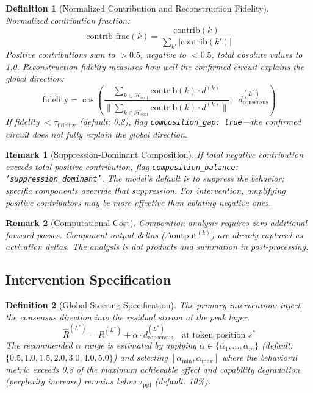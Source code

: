 \documentclass[11pt]{article}
\newtheorem{definition}{Definition}[section]
\newtheorem{remark}{Remark}[section]
\begin{document}
\begin{definition}[Normalized Contribution and Reconstruction Fidelity]
\label{def:contribution-normalization}
Normalized contribution fraction:
\begin{equation}
\text{contrib\_frac}(k) = \frac{\text{contrib}(k)}{\sum_{k'} |\text{contrib}(k')|}
\end{equation}
Positive contributions sum to $> 0.5$, negative to $< 0.5$, total absolute values to 1.0. Reconstruction fidelity measures how well the confirmed circuit explains the global direction:
\begin{equation}
\text{fidelity} = \cos\!\left(\frac{\sum_{k \in \mathcal{H}_{\text{conf}}} \text{contrib}(k) \cdot d^{(k)}}{\|\sum_{k \in \mathcal{H}_{\text{conf}}} \text{contrib}(k) \cdot d^{(k)}\|},\;\; d^{(L^*)}_{\text{consensus}}\right)
\end{equation}
If fidelity $< \tau_{\text{fidelity}}$ (default: 0.8), flag \texttt{composition\_gap: true}---the confirmed circuit does not fully explain the global direction.
\end{definition}

\begin{remark}[Suppression-Dominant Composition]
If total negative contribution exceeds total positive contribution, flag \texttt{composition\_balance: `suppression\_dominant'}. The model's default is to suppress the behavior; specific components override that suppression. For intervention, amplifying positive contributors may be more effective than ablating negative ones.
\end{remark}

\begin{remark}[Computational Cost]
Composition analysis requires zero additional forward passes. Component output deltas ($\Delta\text{output}^{(k)}$) are already captured as activation deltas. The analysis is dot products and summation in post-processing.
\end{remark}

\subsection{Intervention Specification}
\label{app:intervention-spec}

\begin{definition}[Global Steering Specification]
\label{def:global-steering}
The primary intervention: inject the consensus direction into the residual stream at the peak layer.
\begin{equation}
\hat{R}^{(L^*)} = R^{(L^*)} + \alpha \cdot d^{(L^*)}_{\text{consensus}} \quad \text{at token position } s^*
\end{equation}
The recommended $\alpha$ range is estimated by applying $\alpha \in \{\alpha_1, \ldots, \alpha_m\}$ (default: $\{0.5, 1.0, 1.5, 2.0, 3.0, 4.0, 5.0\}$) and selecting $[\alpha_{\min}, \alpha_{\max}]$ where the behavioral metric exceeds 0.8 of the maximum achievable effect and capability degradation (perplexity increase) remains below $\tau_{\text{ppl}}$ (default: 10\%).
\end{definition}
\end{document}
